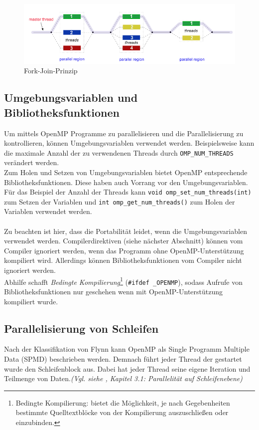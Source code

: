\documentclass[11pt]{scrartcl}
\begin{document}
\begin{figure}[h!]
\centering
\includegraphics[width=1.0\textwidth]{img/fork_join.png}
\caption{Fork-Join-Prinzip}
\label{join_fork_model}
\end{figure} 

\subsection{Umgebungsvariablen und Bibliotheksfunktionen}

Um mittels OpenMP Programme zu parallelisieren und die Parallelisierung zu kontrollieren, können Umgebungsvariablen verwendet werden. Beispielsweise kann die maximale Anzahl der zu verwendenen Threads durch \texttt{OMP\_NUM\_THREADS} verändert werden.\\ 
Zum Holen und Setzen von Umgebungsvariablen bietet OpenMP entsprechende Bibliotheksfunktionen. Diese haben auch Vorrang vor den Umgebungsvariablen.\\ Für das Beispiel der Anzahl der Threads kann \texttt{void omp\_set\_num\_threads(int)} zum Setzen der Variablen und \texttt{int omp\_get\_num\_threads()} zum Holen der Variablen verwendet werden.\\
\\
Zu beachten ist hier, dass die Portabilität leidet, wenn die Umgebungsvariablen verwendet werden. Compilerdirektiven (siehe nächster Abschnitt) können vom Compiler ignoriert werden, wenn das Programm ohne OpenMP-Unterstützung kompiliert wird. Allerdings können Bibliotheksfunktionen vom Compiler nicht ignoriert werden. \\
Abhilfe schafft \textit{Bedingte Kompilierung}\footnote{Bedingte Kompilierung: bietet die Möglichkeit, je nach Gegebenheiten bestimmte Quelltextblöcke von der Kompilierung auszuschließen oder einzubinden. } (\texttt{\#ifdef \_OPENMP}), sodass Aufrufe von Bibliotheksfunktionen nur geschehen wenn mit OpenMP-Unterstützung kompiliert wurde. 

\subsection{Parallelisierung von Schleifen} 
Nach der Klassifikation von Flynn kann OpenMP als Single Programm Multiple Data (SPMD) beschrieben werden. Demnach führt jeder Thread der gestartet wurde den Schleifenblock aus. Dabei hat jeder Thread seine eigene Iteration und Teilmenge von Daten.\textit{(Vgl. siehe \cite{openmp08}, Kapitel 3.1: Parallelität auf Schleifenebene)}
\end{document}
